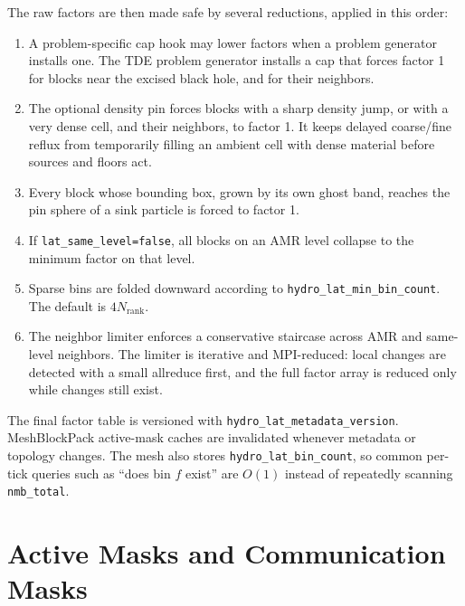 \documentclass[11pt]{article}
\newcommand{\fac}{f}
\begin{document}
The raw factors are then made safe by several reductions, applied in this
order:
\begin{enumerate}
  \item A problem-specific cap hook may lower factors when a problem generator
        installs one.  The TDE problem generator installs a cap that forces
        factor 1 for blocks near the excised black hole, and for their
        neighbors.
  \item The optional density pin forces blocks with a sharp density jump, or
        with a very dense cell, and their neighbors, to factor 1.  It keeps
        delayed coarse/fine reflux from temporarily filling an ambient cell
        with dense material before sources and floors act.
  \item Every block whose bounding box, grown by its own ghost band,
        reaches the pin sphere of a sink particle is forced to factor 1.
  \item If \texttt{lat\_same\_level=false}, all blocks on an AMR level
        collapse to the minimum factor on that level.
  \item Sparse bins are folded downward according to
        \texttt{hydro\_lat\_min\_bin\_count}.  The default is
        \(4N_{\mathrm{rank}}\).
  \item The neighbor limiter enforces a conservative staircase across AMR and
        same-level neighbors.  The limiter is iterative and MPI-reduced: local
        changes are detected with a small allreduce first, and the full factor
        array is reduced only while changes still exist.
\end{enumerate}

The final factor table is versioned with
\texttt{hydro\_lat\_metadata\_version}.  MeshBlockPack active-mask caches are
invalidated whenever metadata or topology changes.  The mesh also stores
\texttt{hydro\_lat\_bin\_count}, so common per-tick queries such as ``does bin
\(\fac\) exist'' are \(O(1)\) instead of repeatedly scanning
\texttt{nmb\_total}.

\section{Active Masks and Communication Masks}
\end{document}
